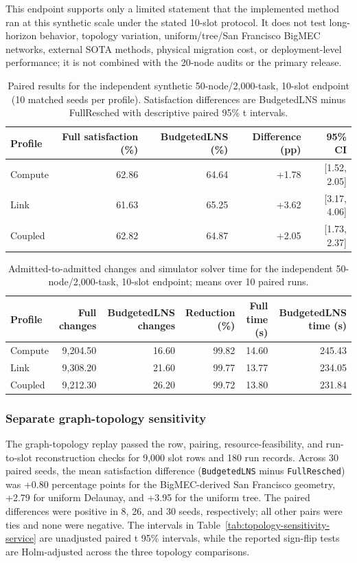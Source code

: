 \documentclass[preprint,12pt]{elsarticle}
\begin{document}
This endpoint supports only a limited statement that the implemented method
ran at this synthetic scale under the stated 10-slot protocol. It does not test
long-horizon behavior, topology variation, uniform/tree/San Francisco BigMEC
networks, external SOTA methods, physical migration cost, or deployment-level
performance; it is not combined with the 20-node audits or the primary release.
\begin{table}[H]\centering
\caption{Paired results for the independent synthetic 50-node/2,000-task, 10-slot endpoint (10 matched seeds per profile). Satisfaction differences are BudgetedLNS minus FullResched with descriptive paired 95\% t intervals.}
\label{tab:scale-audit-2000-service}\scriptsize\setlength{\tabcolsep}{3pt}
\begin{tabular}{lrrrr}\toprule
Profile & Full satisfaction (\%) & BudgetedLNS (\%) & Difference (pp) & 95\% CI \\ \midrule
Compute & 62.86 & 64.64 & +1.78 & [1.52, 2.05] \\
Link & 61.63 & 65.25 & +3.62 & [3.17, 4.06] \\
Coupled & 62.82 & 64.87 & +2.05 & [1.73, 2.37] \\ \bottomrule\end{tabular}\end{table}
\begin{table}[H]\centering
\caption{Admitted-to-admitted changes and simulator solver time for the independent 50-node/2,000-task, 10-slot endpoint; means over 10 paired runs.}
\label{tab:scale-audit-2000-cost}\scriptsize\setlength{\tabcolsep}{3pt}
\begin{tabular}{lrrrrr}\toprule
Profile & Full changes & BudgetedLNS changes & Reduction (\%) & Full time (s) & BudgetedLNS time (s) \\ \midrule
Compute & 9,204.50 & 16.60 & 99.82 & 14.60 & 245.43 \\
Link & 9,308.20 & 21.60 & 99.77 & 13.77 & 234.05 \\
Coupled & 9,212.30 & 26.20 & 99.72 & 13.80 & 231.84 \\ \bottomrule\end{tabular}\end{table}

\subsubsection{Separate graph-topology sensitivity}

The graph-topology replay passed the row, pairing, resource-feasibility, and
run-to-slot reconstruction checks for 9,000 slot rows and 180 run records.
Across 30 paired seeds, the mean satisfaction difference
(\texttt{BudgetedLNS} minus \texttt{FullResched}) was +0.80 percentage points
for the BigMEC-derived San Francisco geometry, +2.79 for uniform Delaunay,
and +3.95 for the uniform tree. The paired differences were positive in 8,
26, and 30 seeds, respectively; all other pairs were ties and none were
negative. The intervals in Table~\ref{tab:topology-sensitivity-service} are
unadjusted paired t 95\% intervals, while the reported sign-flip tests are
Holm-adjusted across the three topology comparisons.
\end{document}

